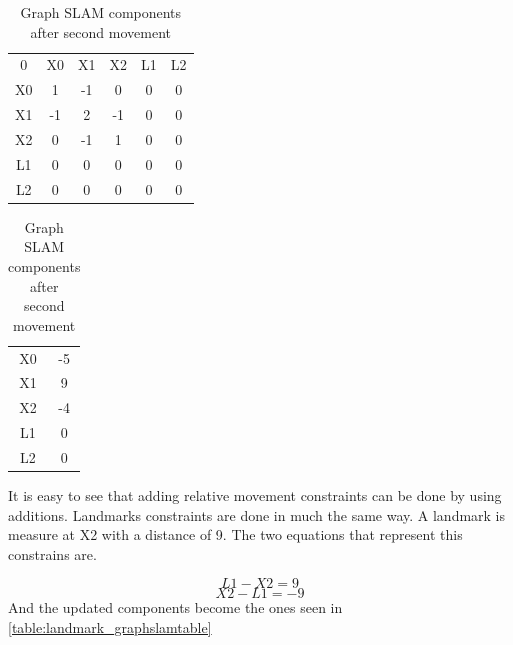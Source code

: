 \documentclass[Main]{subfiles}
\begin{document}
\begin{table}[H]
	\begin{subtable}{0.5\linewidth}
		\centering
	\begin{tabular}{cccccc}
		0 & X0 & X1 & X2 & L1 & L2 \\ 
		X0 & 1 & -1 & 0 & 0 & 0  \\ 
		X1 & -1 & 2 & -1 & 0 & 0  \\ 
		X2 & 0 & -1 & 1 & 0 & 0  \\  
		L1 & 0 & 0 & 0 & 0 & 0  \\ 
		L2 & 0 & 0 & 0 & 0 & 0  \\ 
	\end{tabular}
	\caption{$\Omega$ }
	\end{subtable}
	\begin{subtable}{0.5\linewidth}
		\centering
		\begin{tabular}{cc}
			X0 & -5 \\ 
			X1 & 9 \\ 
			X2 & -4 \\ 
			L1 & 0 \\  
			L2 & 0 \\ 
		\end{tabular}
	\caption{$\xi$}
	\end{subtable}
\caption{Graph SLAM components after second movement}
\label{table:secondmovement_graphslamtable} 
\end{table} \noindent

It is easy to see that adding relative movement constraints can be done by using additions. Landmarks constraints are done in much the same way.
A landmark is measure at X2 with a distance of 9. The two equations that represent this constrains are.

	\begin{equation}
		L1 - X2 = 9
	\end{equation}
	\begin{equation}
		X2 - L1 = -9
	\end{equation}
And the updated components become the ones seen in \autoref{table:landmark_graphslamtable}
\end{document}
